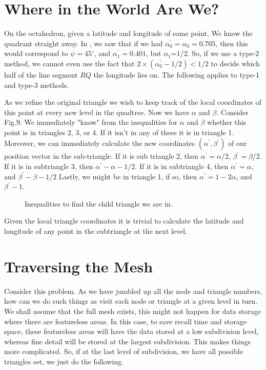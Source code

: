 \documentclass[12pt]{article}
\begin{document}
\section{Where in the World Are We?}

On the octahedron, given a latitude and longitude of some point,
We know the quadrant straight away. 
In , we saw that if we had
 $\alpha_0^\prime=\alpha_0=0.705$, then
this would correspond to $\psi=45^\circ$, and $\alpha_1^\prime=0.401$,
but $\alpha_1$=1/2. So, if we use a type-2 method, we cannot even use
the fact that $2 \times ( \alpha_0^\prime-1/2) <1/2$ to decide which
half of the line segment $RQ$ the longitude lies on.
The following applies to type-1 and type-3 methods.


As we refine the original triangle
we wish to keep track of the local coordinates of this point at
every new level in the quadtree.
Now we have $\alpha$ and $\beta$. Consider Fig.9. We immediately "know"
from the inequalities for $\alpha$ and $\beta$ whether this point 
is in triangles 2, 3, or 4. If it isn't in any of these
it is in triangle 1. Moreover, we can immediately calculate the new
coordinates $(\alpha^\prime,\beta^\prime)$ of our position vector
in the sub-triangle. If it is sub triangle 2, then $\alpha^\prime=\alpha/2$, 
 $\beta^\prime=\beta/2$.
If it is  in subtriangle 3, then $\alpha^\prime-\alpha-1/2$. If it is in subtriangle
4, then $\alpha^\prime=\alpha$, and $\beta^\prime-\beta-1/2$ Lastly, we might be
in triangle 1, if so, then $\alpha^\prime=1-2\alpha$, and $\beta^\prime-1$.

\vspace*{10cm}
\begin{figure}[htb]
\caption{ 
Inequalities to find the child triangle we are in.
}
\end{figure}

Given the local triangle coordinates
it is trivial to calculate the latitude and longitude of any point in the
subtriangle at the next level.

\section{Traversing the Mesh}

Consider this problem. As we have jumbled up all the node and triangle 
numbers, how can we do such things as visit each node or triangle
at a given level in turn. We shall assume that the full mesh exists,
this might not happen for data storage where there are featureless areas.
In this case, to save recall time and storage space, these featureless areas
will have the data stored at a low subdivision level, whereas fine detail
will be stored at the largest subdivision. This makes things more complicated.
So, if at the last level of subdivision, we have all possible triangles set,
we just do the following.
\end{document}
